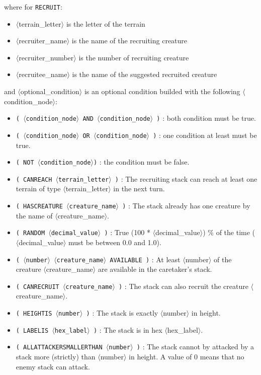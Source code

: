 \documentclass{article}
\begin{document}
where for \texttt{RECRUIT}:

\begin{itemize}
\item $\langle$terrain\_letter$\rangle$ is the letter of the terrain
\item $\langle$recruiter\_name$\rangle$ is the name of the recruiting creature
\item $\langle$recruiter\_number$\rangle$ is the number of recruiting creature
\item $\langle$recruitee\_name$\rangle$ is the name of the suggested recruited creature
\end{itemize}

and $\langle$optional\_condition$\rangle$ is an optional condition builded with the following $\langle$condition\_node$\rangle$:

\begin{itemize}
\item \texttt{( $\langle$condition\_node$\rangle$ AND $\langle$condition\_node$\rangle$ )} : both condition must be true.
\item \texttt{( $\langle$condition\_node$\rangle$ OR $\langle$condition\_node$\rangle$ )} : one condition at least must be true.
\item \texttt{( NOT $\langle$condition\_node$\rangle$)} : the condition must be false.
\item \texttt{( CANREACH $\langle$terrain\_letter$\rangle$ )} : The recruiting stack can reach at least one terrain of type $\langle$terrain\_letter$\rangle$ in the next turn.
\item \texttt{( HASCREATURE $\langle$creature\_name$\rangle$ )} : The stack already has one creature by the name of $\langle$creature\_name$\rangle$.
\item \texttt{( RANDOM $\langle$decimal\_value$\rangle$ )} : True (100 * $\langle$decimal\_value$\rangle$) \% of the time ($\langle$decimal\_value$\rangle$ must be between 0.0 and 1.0).
\item \texttt{( $\langle$number$\rangle$ $\langle$creature\_name$\rangle$ AVAILABLE )} : At least $\langle$number$\rangle$ of the creature $\langle$creature\_name$\rangle$ are available in the caretaker's stack.
\item \texttt{( CANRECRUIT $\langle$creature\_name$\rangle$ )} : The stack can also recruit the creature $\langle$creature\_name$\rangle$.
\item \texttt{( HEIGHTIS $\langle$number$\rangle$ )} : The stack is exactly $\langle$number$\rangle$ in height.
\item \texttt{( LABELIS $\langle$hex\_label$\rangle$ )} : The stack is in hex $\langle$hex\_label$\rangle$.
\item \texttt{( ALLATTACKERSMALLERTHAN $\langle$number$\rangle$ )} : The stack cannot by attacked by a stack more (strictly) than $\langle$number$\rangle$ in height. A value of 0 means that no enemy stack can attack.
\end{itemize}
\end{document}
